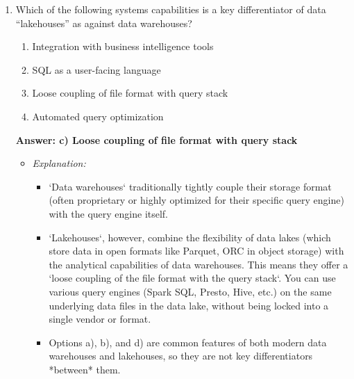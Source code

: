 \documentclass{article}
\begin{document}
\begin{enumerate}[label=\textbf{Question \arabic*.}]

    \item Which of the following systems capabilities is a key differentiator of data “lakehouses” as against data warehouses?
        \begin{enumerate}[label=\alph*)]
            \item Integration with business intelligence tools
            \item SQL as a user-facing language
            \item Loose coupling of file format with query stack
            \item Automated query optimization
        \end{enumerate}
        \textbf{Answer: c) Loose coupling of file format with query stack}
        \begin{itemize}
            \item \textit{Explanation:}
            \begin{itemize}
                \item `Data warehouses` traditionally tightly couple their storage format (often proprietary or highly optimized for their specific query engine) with the query engine itself.
                \item `Lakehouses`, however, combine the flexibility of data lakes (which store data in open formats like Parquet, ORC in object storage) with the analytical capabilities of data warehouses. This means they offer a `loose coupling of the file format with the query stack`. You can use various query engines (Spark SQL, Presto, Hive, etc.) on the same underlying data files in the data lake, without being locked into a single vendor or format.
                \item Options a), b), and d) are common features of both modern data warehouses and lakehouses, so they are not key differentiators *between* them.
            \end{itemize}
        \end{itemize}
    

\end{enumerate}
\end{document}

